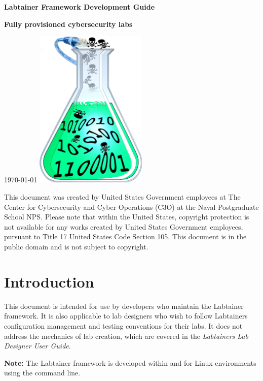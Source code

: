 \documentclass[12pt]{article}
\begin{document}
\begin{titlepage}
\centering
\vfill
\vspace*{4\baselineskip}
{\bfseries\Large
Labtainer Framework Development Guide\par
}
\vspace*{4\baselineskip}
{\bfseries
Fully provisioned cybersecurity labs\par
}
\vspace*{2\baselineskip}
\today
\vfill
\includegraphics[width=0.4\textwidth]{labtainer5-sm.png}
\vfill

\vspace{2.0in}
This document was created by United States Government employees at 
The Center for Cybersecurity and Cyber Operations (C3O) at the Naval Postgraduate School NPS. 
Please note that within the United States, copyright protection is not available for any works created  
by United States Government employees, pursuant to Title 17 United States Code Section 105.   
This document is in the public domain and is not subject to copyright. 
\end{titlepage}
\tableofcontents
\newpage
\section {Introduction}
This document is intended for use by developers who maintain the
Labtainer framework.  It is also applicable to lab designers who wish
to follow Labtainers configuration management and testing conventions for  their labs.
It does not address the mechanics of lab creation, which are 
covered in the \textit {Labtainers Lab Designer User Guide}.

\begin{flushleft} 
{\bf Note:} 
The Labtainer framework is developed within and for Linux environments using the command line.
\end{flushleft} 
\end{document}
